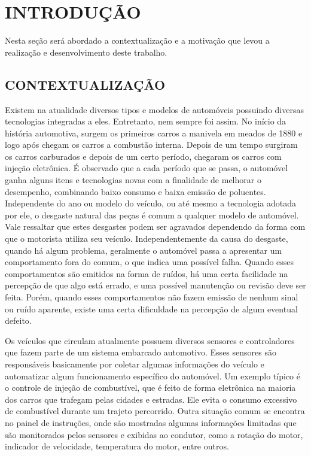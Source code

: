 \chapter{INTRODUÇÃO}\label{CAP:introducao}
Nesta seção será abordado a contextualização e a motivação que levou a realização e desenvolvimento deste trabalho.
\section{CONTEXTUALIZAÇÃO}
Existem na atualidade diversos tipos e modelos de automóveis possuindo diversas tecnologias integradas a eles. Entretanto, nem sempre foi assim. No início da história automotiva, surgem os primeiros carros a manivela em meados de 1880 e logo após chegam os carros a combustão interna. Depois de um tempo surgiram os carros carburados e depois de um certo período, chegaram os carros com injeção eletrônica. É observado que a cada período que se passa, o automóvel ganha alguns itens e tecnologias novas com a finalidade de melhorar o desempenho, combinando baixo consumo e baixa emissão de poluentes. Independente do ano ou modelo do veículo, ou até mesmo a tecnologia adotada por ele, o desgaste natural das peças é comum a qualquer modelo de automóvel. Vale ressaltar que estes desgastes podem ser agravados dependendo da forma com que o motorista utiliza seu veículo. Independentemente da causa do desgaste, quando há algum problema, geralmente o automóvel passa a apresentar um comportamento fora do comum, o que indica uma possível falha. Quando esses comportamentos são emitidos na forma de ruídos, há uma certa facilidade na percepção de que algo está errado, e uma possível manutenção ou revisão deve ser feita. Porém, quando esses comportamentos não fazem emissão de nenhum sinal ou ruído aparente, existe uma certa dificuldade na percepção de algum eventual defeito.

Os veículos que circulam atualmente possuem diversos sensores e controladores que fazem parte de um sistema embarcado automotivo. Esses sensores são responsáveis basicamente por coletar algumas informações do veículo e automatizar algum funcionamento específico do automóvel. Um exemplo típico é o controle de injeção de combustível, que é feito de forma eletrônica na maioria dos carros que trafegam pelas cidades e estradas. Ele evita o consumo excessivo de combustível durante um trajeto percorrido. Outra situação comum se encontra no painel de instruções, onde são mostradas algumas informações limitadas que são monitorados pelos sensores e exibidas ao condutor, como a rotação do motor, indicador de velocidade, temperatura do motor, entre outros. 

